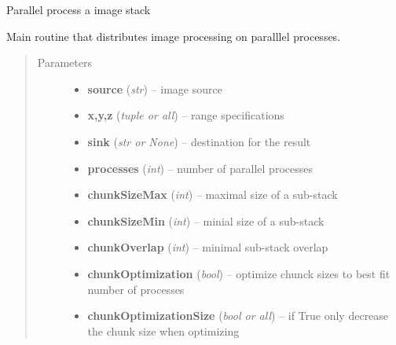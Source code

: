 \documentclass[letterpaper,10pt,english]{sphinxmanual}
\begin{document}
\begin{fulllineitems}
\label{api/ClearMap.ImageProcessing:ClearMap.ImageProcessing.StackProcessing.parallelProcessStack}
Parallel process a image stack

Main routine that distributes image processing on paralllel processes.
\begin{quote}\begin{description}
\item[{Parameters}] \leavevmode\begin{itemize}
\item {} 
\textbf{source} (\emph{str}) --
image source

\item {} 
\textbf{x,y,z} (\emph{tuple or all}) --
range specifications

\item {} 
\textbf{sink} (\emph{str or None}) --
destination for the result

\item {} 
\textbf{processes} (\emph{int}) --
number of parallel processes

\item {} 
\textbf{chunkSizeMax} (\emph{int}) --
maximal size of a sub-stack

\item {} 
\textbf{chunkSizeMin} (\emph{int}) --
minial size of a sub-stack

\item {} 
\textbf{chunkOverlap} (\emph{int}) --
minimal sub-stack overlap

\item {} 
\textbf{chunkOptimization} (\emph{bool}) --
optimize chunck sizes to best fit number of processes

\item {} 
\textbf{chunkOptimizationSize} (\emph{bool or all}) --
if True only decrease the chunk size when optimizing


\end{itemize}
\end{description}
\end{quote}
\end{fulllineitems}
\end{document}
